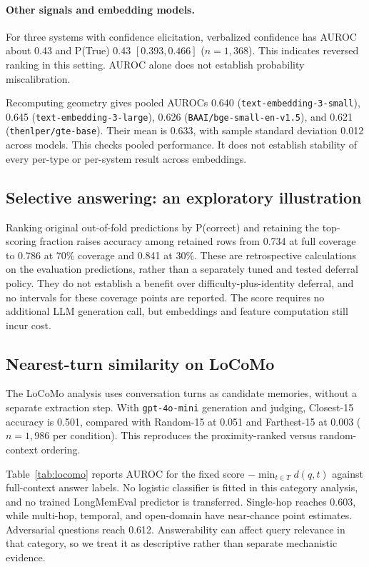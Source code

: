 \documentclass{article}
\begin{document}
\paragraph{Other signals and embedding models.}
For three systems with confidence elicitation, verbalized confidence
has AUROC about 0.43 and P(True) 0.43 $[0.393,0.466]$ ($n=1{,}368$).
This indicates reversed ranking in this setting.
AUROC alone does not establish probability miscalibration.

Recomputing geometry gives pooled AUROCs
0.640 (\texttt{text-embedding-3-small}),
0.645 (\texttt{text-embedding-3-large}),
0.626 (\texttt{BAAI/bge-small-en-v1.5}), and
0.621 (\texttt{thenlper/gte-base}).
Their mean is 0.633, with sample standard deviation 0.012 across models.
This checks pooled performance. It does not establish stability of every
per-type or per-system result across embeddings.

\subsection{Selective answering: an exploratory illustration}
\label{sec:selective}

Ranking original out-of-fold predictions by P(correct) and retaining the
top-scoring fraction raises accuracy among retained rows from 0.734 at
full coverage to 0.786 at 70\% coverage and 0.841 at 30\%.
These are retrospective calculations on the evaluation predictions,
rather than a separately tuned and tested deferral policy.
They do not establish a benefit over difficulty-plus-identity deferral,
and no intervals for these coverage points are reported.
The score requires no additional LLM generation call, but embeddings and
feature computation still incur cost.

\subsection{Nearest-turn similarity on LoCoMo}
\label{sec:locomo}

The LoCoMo analysis uses conversation turns as candidate memories,
without a separate extraction step.
With \texttt{gpt-4o-mini} generation and judging, Closest-15 accuracy
is 0.501, compared with Random-15 at 0.051 and Farthest-15 at 0.003
($n=1{,}986$ per condition).
This reproduces the proximity-ranked versus random-context ordering.

Table~\ref{tab:locomo} reports AUROC for the fixed score
$-\min_{t\in T}d(q,t)$ against full-context answer labels.
No logistic classifier is fitted in this category analysis, and no trained
LongMemEval predictor is transferred.
Single-hop reaches 0.603, while multi-hop, temporal, and open-domain have
near-chance point estimates. Adversarial questions reach 0.612.
Answerability can affect query relevance in that category, so we treat it as
descriptive rather than separate mechanistic evidence.
\end{document}
